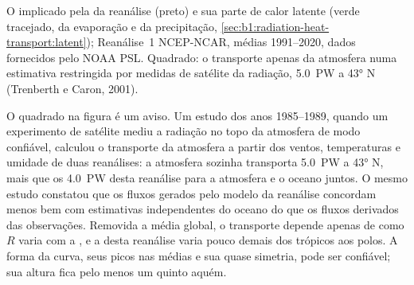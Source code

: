 \begin{omfigure}

{\small O  implicado pela  da reanálise (preto) e sua
parte de calor latente (verde tracejado, da evaporação e da precipitação,
\cref{sec:b1:radiation-heat-transport:latent}); Reanálise~1 NCEP-NCAR, médias 1991--2020, dados
fornecidos pelo NOAA PSL. Quadrado: o transporte apenas da atmosfera numa estimativa restringida
por medidas de satélite da radiação, \qty{5.0}{PW} a \ang{43} N (Trenberth e Caron, 2001).}
\label{fig:b1:radiation-heat-transport:transport}
\end{omfigure}

O quadrado na figura é um aviso. Um estudo dos anos 1985--1989, quando um experimento de satélite
mediu a radiação no topo da atmosfera de modo confiável, calculou o transporte da atmosfera a partir
dos ventos, temperaturas e umidade de duas reanálises: a atmosfera sozinha transporta \qty{5.0}{PW}
a \ang{43} N, mais que os \qty{4.0}{PW} desta reanálise para a atmosfera e o oceano juntos. O mesmo
estudo constatou que os fluxos gerados pelo modelo da reanálise concordam menos bem com estimativas
independentes do oceano do que os fluxos derivados das observações. Removida a média global, o
transporte depende apenas de como $R$ varia com a , e a  desta reanálise
varia pouco demais dos trópicos aos polos. A forma da curva, seus picos nas  médias e sua
quase simetria, pode ser confiável; sua altura fica pelo menos um quinto aquém.


